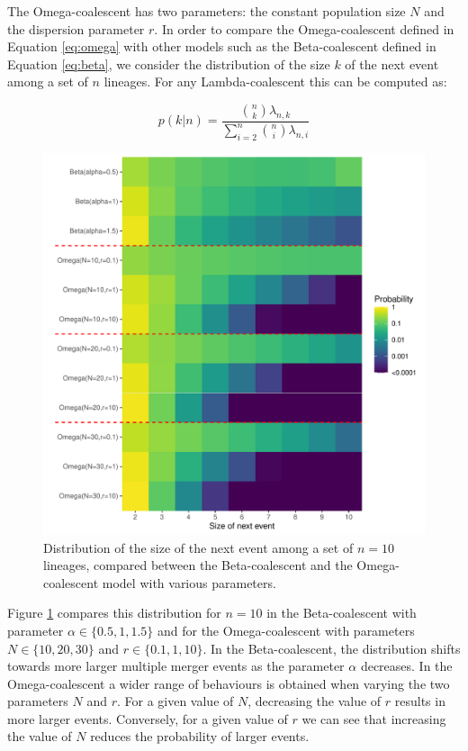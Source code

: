 \documentclass{article}
\renewcommand{\eqref}[1]{\ref{#1}}
\begin{document}
The Omega-coalescent has two parameters: the constant population size $N$ and
the dispersion parameter $r$. 
In order to compare the Omega-coalescent defined in Equation \eqref{eq:omega}
with other models such as the Beta-coalescent defined in Equation \eqref{eq:beta}, we consider 
the distribution of the size $k$ of the next event among
a set of $n$ lineages. For any Lambda-coalescent this can be computed as:

\begin{equation}
p(k|n)=\frac{\binom{n}{k}\lambda_{n,k}}{\sum_{i=2}^n \binom{n}{i}\lambda_{n,i}}
\label{eq:nextsize}
\end{equation}

\begin{figure}[!p]
\begin{center}
\includegraphics[width=15cm]{../run/figureCompare.pdf}
\end{center}
\caption{Distribution of the size of the next event among a set of $n=10$ lineages, 
compared between the Beta-coalescent and the Omega-coalescent model 
with various parameters.
\label{fig:compare}}
\end{figure}

Figure \ref{fig:compare} compares this distribution for $n=10$ in the Beta-coalescent with 
parameter $\alpha \in \{0.5,1,1.5\}$ and for the Omega-coalescent with parameters
$N \in \{10,20,30\}$ and $r \in \{0.1,1,10\}$. In the Beta-coalescent, the distribution
shifts towards more larger multiple merger events as the parameter $\alpha$ decreases.
In the Omega-coalescent a wider range of behaviours is obtained when varying the two parameters
$N$ and $r$. For a given value of $N$, decreasing the value of $r$ results in more
larger events. Conversely, for a given value of $r$ we can see that increasing the
value of $N$ reduces the probability of larger events.
\end{document}
